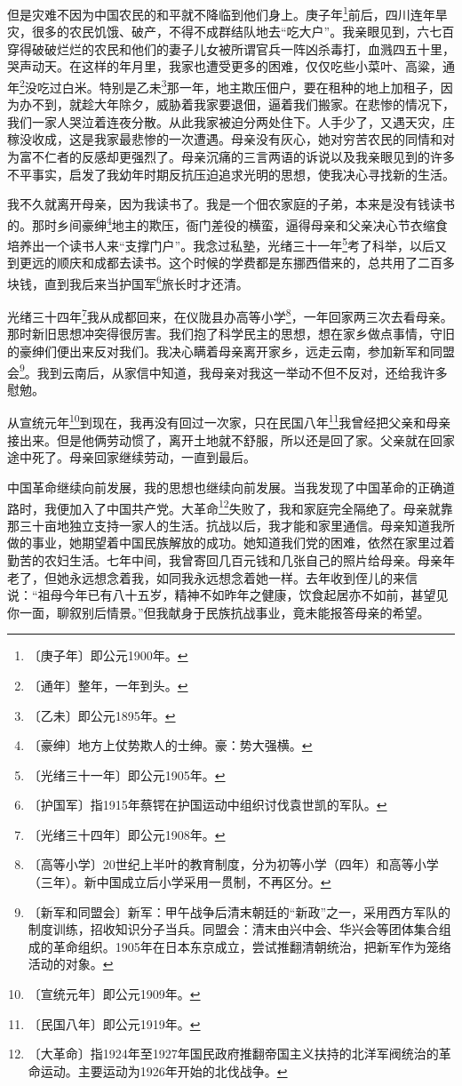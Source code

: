 \documentclass[12pt,UTF-8,openany]{ctexbook}
\begin{document}
\begin{normalsize}
    但是灾难不因为中国农民的和平就不降临到他们身上。庚子年\footnote{〔庚子年〕即公元1900年。}前后，四川连年旱灾，很多的农民饥饿、破产，不得不成群结队地去“吃大户”。我亲眼见到，六七百穿得破破烂烂的农民和他们的妻子儿女被所谓官兵一阵凶杀毒打，血溅四五十里，哭声动天。在这样的年月里，我家也遭受更多的困难，仅仅吃些小菜叶、高粱，通年\footnote{〔通年〕整年，一年到头。}没吃过白米。特别是乙未\footnote{〔乙未〕即公元1895年。}那一年，地主欺压佃户，要在租种的地上加租子，因为办不到，就趁大年除夕，威胁着我家要退佃，逼着我们搬家。在悲惨的情况下，我们一家人哭泣着连夜分散。从此我家被迫分两处住下。人手少了，又遇天灾，庄稼没收成，这是我家最悲惨的一次遭遇。母亲没有灰心，她对穷苦农民的同情和对为富不仁者的反感却更强烈了。母亲沉痛的三言两语的诉说以及我亲眼见到的许多不平事实，启发了我幼年时期反抗压迫追求光明的思想，使我决心寻找新的生活。
    
    我不久就离开母亲，因为我读书了。我是一个佃农家庭的子弟，本来是没有钱读书的。那时乡间豪绅\footnote{〔豪绅〕地方上仗势欺人的士绅。豪：势大强横。}地主的欺压，衙门差役的横蛮，逼得母亲和父亲决心节衣缩食培养出一个读书人来“支撑门户”。我念过私塾，光绪三十一年\footnote{〔光绪三十一年〕即公元1905年。}考了科举，以后又到更远的顺庆和成都去读书。这个时候的学费都是东挪西借来的，总共用了二百多块钱，直到我后来当护国军\footnote{〔护国军〕指1915年蔡锷在护国运动中组织讨伐袁世凯的军队。}旅长时才还清。
    
    光绪三十四年\footnote{〔光绪三十四年〕即公元1908年。}我从成都回来，在仪陇县办高等小学\footnote{〔高等小学〕20世纪上半叶的教育制度，分为初等小学（四年）和高等小学（三年）。新中国成立后小学采用一贯制，不再区分。}，一年回家两三次去看母亲。那时新旧思想冲突得很厉害。我们抱了科学民主的思想，想在家乡做点事情，守旧的豪绅们便出来反对我们。我决心瞒着母亲离开家乡，远走云南，参加新军和同盟会\footnote{〔新军和同盟会〕新军：甲午战争后清末朝廷的“新政”之一，采用西方军队的制度训练，招收知识分子当兵。同盟会：清末由兴中会、华兴会等团体集合组成的革命组织。1905年在日本东京成立，尝试推翻清朝统治，把新军作为笼络活动的对象。}。我到云南后，从家信中知道，我母亲对我这一举动不但不反对，还给我许多慰勉。
    
    从宣统元年\footnote{〔宣统元年〕即公元1909年。}到现在，我再没有回过一次家，只在民国八年\footnote{〔民国八年〕即公元1919年。}我曾经把父亲和母亲接出来。但是他俩劳动惯了，离开土地就不舒服，所以还是回了家。父亲就在回家途中死了。母亲回家继续劳动，一直到最后。
    
    中国革命继续向前发展，我的思想也继续向前发展。当我发现了中国革命的正确道路时，我便加入了中国共产党。大革命\footnote{〔大革命〕指1924年至1927年国民政府推翻帝国主义扶持的北洋军阀统治的革命运动。主要运动为1926年开始的北伐战争。}失败了，我和家庭完全隔绝了。母亲就靠那三十亩地独立支持一家人的生活。抗战以后，我才能和家里通信。母亲知道我所做的事业，她期望着中国民族解放的成功。她知道我们党的困难，依然在家里过着勤苦的农妇生活。七年中间，我曾寄回几百元钱和几张自己的照片给母亲。母亲年老了，但她永远想念着我，如同我永远想念着她一样。去年收到侄儿的来信说：“祖母今年已有八十五岁，精神不如昨年之健康，饮食起居亦不如前，甚望见你一面，聊叙别后情景。”但我献身于民族抗战事业，竟未能报答母亲的希望。
    

\end{normalsize}
\end{document}
